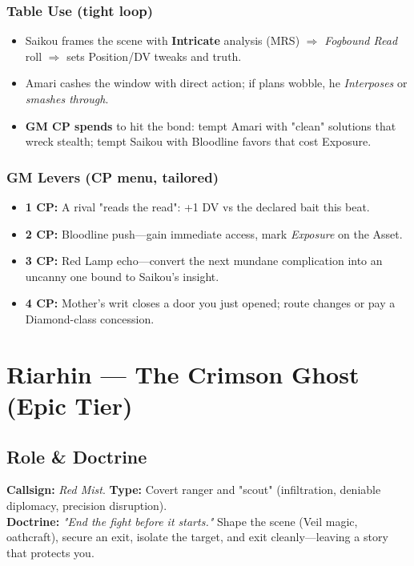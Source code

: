 \subsubsection{Table Use (tight loop)}
\begin{itemize}
  \item Saikou frames the scene with \textbf{Intricate} analysis (MRS) $\Rightarrow$ \emph{Fogbound Read} roll $\Rightarrow$ sets Position/DV tweaks and truth.
  \item Amari cashes the window with direct action; if plans wobble, he \emph{Interposes} or \emph{smashes through}.
  \item \textbf{GM CP spends} to hit the bond: tempt Amari with "clean" solutions that wreck stealth; tempt Saikou with Bloodline favors that cost Exposure.
\end{itemize}

\subsubsection{GM Levers (CP menu, tailored)}
\begin{itemize}
  \item \textbf{1 CP:} A rival "reads the read": +1 DV vs the declared bait this beat.
  \item \textbf{2 CP:} Bloodline push—gain immediate access, mark \emph{Exposure} on the Asset.
  \item \textbf{3 CP:} Red Lamp echo—convert the next mundane complication into an uncanny one bound to Saikou's insight.
  \item \textbf{4 CP:} Mother's writ closes a door you just opened; route changes or pay a Diamond-class concession.
\end{itemize}

\section{Riarhin — The Crimson Ghost (Epic Tier)}

\subsection{Role \& Doctrine}
\textbf{Callsign:} \emph{Red Mist}. \quad
\textbf{Type:} Covert ranger and "scout" (infiltration, deniable diplomacy, precision disruption). \\
\textbf{Doctrine:} \emph{"End the fight before it starts."} Shape the scene (Veil magic, oathcraft), secure  an exit, isolate the target, and exit cleanly—leaving a story that protects you.

